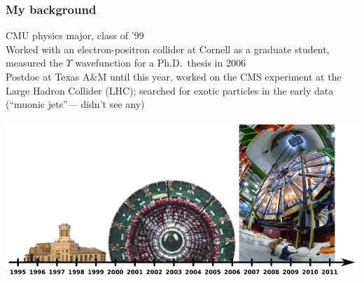 \documentclass[compress]{beamer}
\begin{document}
\begin{frame}
\frametitle{My background}

CMU physics major, class of '99 \\\vspace{0.3 cm}
Worked with an electron-positron collider at Cornell as a graduate student, measured the $\Upsilon$ wavefunction for a Ph.D.\ thesis in 2006 \\\vspace{0.3 cm}
Postdoc at Texas A\&M until this year, worked on the CMS experiment at the Large Hadron Collider (LHC); searched for exotic particles in the early data (``muonic jets''--- didn't see any) \\\vspace{0.3 cm}

\includegraphics[width=\linewidth]{timeline.png}
\end{frame}
\end{document}
